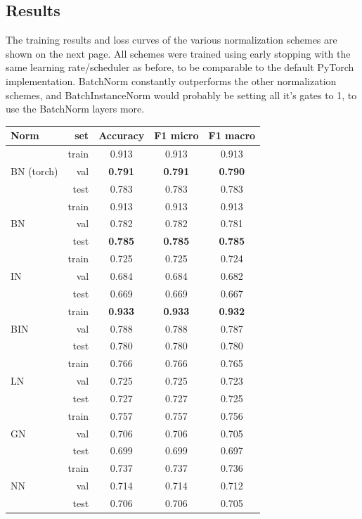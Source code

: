 \documentclass[12pt]{article}
\begin{document}
\pagebreak 
\subsection{Results}
The training results and loss curves of the various normalization schemes are
shown on the next page. All schemes were trained using early stopping with the
same learning rate/scheduler as before, to be comparable to the default PyTorch 
implementation. BatchNorm constantly outperforms the other normalization
schemes, and BatchInstanceNorm would probably be setting all it's gates to 1,
to use the BatchNorm layers more.

\begin{center}
\begin{tabular}{|l|r|c|c|c|}
    \hline
    Norm & set & Accuracy & F1 micro & F1 macro \\
    \hline
    \multirow{3}{*}{BN (torch)}%
    & train & 0.913 & 0.913 & 0.913 \\
    & val & \textbf{0.791} & \textbf{0.791} & \textbf{0.790} \\
    & test & 0.783 & 0.783 & 0.783 \\
    \hline

    \hline
    \multirow{3}{*}{BN}%
    & train & 0.913 & 0.913 & 0.913 \\
    & val & 0.782 & 0.782 & 0.781 \\
    & test & \textbf{0.785} & \textbf{0.785} & \textbf{0.785} \\
    \hline

    \hline
    \multirow{3}{*}{IN}%
    & train & 0.725 & 0.725 & 0.724 \\
    & val & 0.684 & 0.684 & 0.682 \\
    & test & 0.669 & 0.669 & 0.667 \\
    \hline

    \hline
    \multirow{3}{*}{BIN}%
    & train & \textbf{0.933} & \textbf{0.933} & \textbf{0.932} \\
    & val & 0.788 & 0.788 & 0.787 \\
    & test & 0.780 & 0.780 & 0.780 \\
    \hline

    \hline
    \multirow{3}{*}{LN}%
    & train & 0.766 & 0.766 & 0.765 \\
    & val & 0.725 & 0.725 & 0.723 \\
    & test & 0.727 & 0.727 & 0.725 \\
    \hline

    \hline
    \multirow{3}{*}{GN}%
    & train & 0.757 & 0.757 & 0.756 \\
    & val & 0.706 & 0.706 & 0.705 \\
    & test & 0.699 & 0.699 & 0.697 \\
    \hline

    \hline
    \multirow{3}{*}{NN}%
    & train & 0.737 & 0.737 & 0.736 \\
    & val & 0.714 & 0.714 & 0.712 \\
    & test & 0.706 & 0.706 & 0.705 \\
    \hline
\end{tabular}
\end{center}
\end{document}
